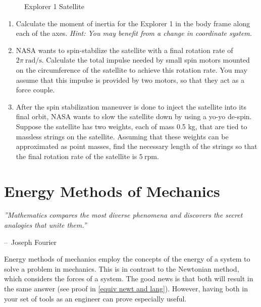 \documentclass[12pt]{report}
\makeatletter
\newenvironment{chapquote}[2][2em]
  {\setlength{\@tempdima}{#1}%
   \def\chapquote@author{#2}%
   \parshape 1 \@tempdima \dimexpr\textwidth-2\@tempdima\relax%
   \itshape}
  {\par\normalfont\hfill--\ \chapquote@author\hspace*{\@tempdima}\par\bigskip}
\makeatother
\begin{document}
\begin{enumerate}
\begin{figure}[ht]

    \caption{Explorer 1 Satellite}
    \label{fig:explorer 1}
\end{figure}
\begin{enumerate}
    \item Calculate the \gls{moment of inertia} for the Explorer 1 in the \gls{body frame} along each of the axes. \textit{Hint: You may benefit from a change in coordinate system.}
    \item NASA wants to spin-stabilize the satellite with a final rotation rate of $2\pi \ \mathrm{rad/s}$. Calculate the total impulse needed by small spin motors mounted on the circumference of the satellite to achieve this rotation rate. You may assume that this impulse is provided by two motors, so that they act as a force couple.
    \item After the spin stabilization maneuver is done to inject the satellite into its final orbit, NASA wants to slow the satellite down by using a yo-yo de-spin. Suppose the satellite has two weights, each of mass 0.5 kg, that are tied to massless strings on the satellite. Assuming that these weights can be approximated as point masses, find the necessary length of the strings so that the final rotation rate of the satellite is $5 \ \mathrm{rpm}$.
\end{enumerate}
\end{enumerate}
\chapter{Energy Methods of Mechanics}\label{sec:energy methods}
\begin{chapquote}{Joseph Fourier}
    ''Mathematics compares the most diverse phenomena and discovers the secret analogies that unite them.''
\end{chapquote}

Energy methods of mechanics employ the concepts of the energy of a system to solve a problem in mechanics. This is in contrast to the Newtonian method, which considers the forces of a system. The good news is that both will result in the same answer (see proof in \ref{equiv newt and lang}). However, having both in your set of tools as an engineer can prove especially useful.
\end{document}
